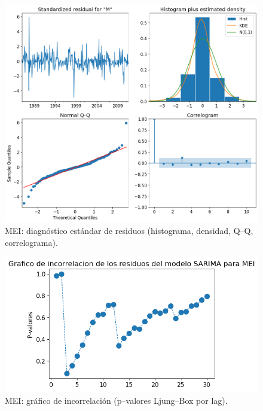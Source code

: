 \begin{figure}[H]\centering
\includegraphics[scale=.52]{Figures/res_std_mei.png}
\caption{MEI: diagnóstico estándar de residuos (histograma, densidad, Q--Q, correlograma).}
\label{fig:std_mei}
\end{figure}

\begin{figure}[H]\centering
\includegraphics[scale=.52]{Figures/inco_mei.png}
\caption{MEI: gráfico de incorrelación (p--valores Ljung--Box por lag).}
\label{fig:inco_mei}
\end{figure}

